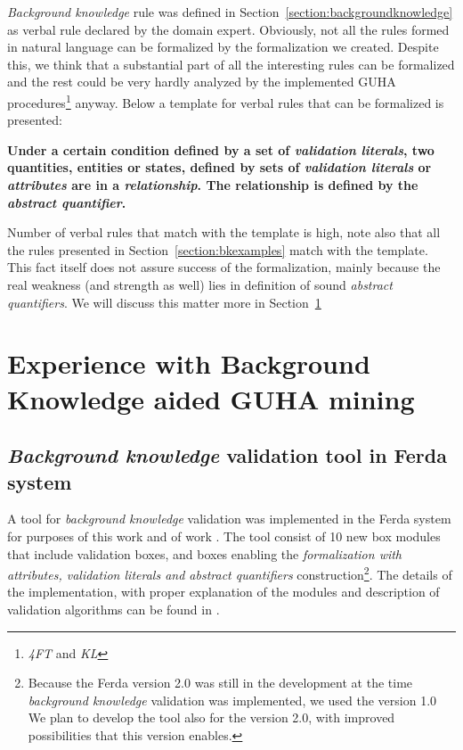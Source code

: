 \documentclass{llncs}
\begin{document}
\emph{Background knowledge} rule was defined in Section~\ref{section:backgroundknowledge}
as verbal rule declared by the domain expert. Obviously, not all the rules formed in natural
language can be formalized by the formalization we created. Despite this, we think that
a substantial part of all the interesting rules can be formalized and the rest could be
very hardly analyzed by the implemented GUHA procedures\footnote{\emph{4FT} and \emph{KL}}
anyway. Below a template for verbal rules that can be formalized is presented:

\medskip
\textbf{Under a certain condition defined by a set of \emph{validation literals},
two quantities, entities or states, defined by sets of \emph{validation literals}
or \emph{attributes} are in a \emph{relationship}. The relationship is defined by
the \emph{abstract quantifier}.}

\medskip
Number of verbal rules that match with the template is high, note also that all
the rules presented in Section~\ref{section:bkexamples} match with the template.
This fact itself does not assure success of the formalization, mainly because the
real weakness (and strength as well) lies in definition of sound \emph{abstract
quantifiers}. We will discuss this matter more in Section~\ref{section:mining}

\section{Experience with Background Knowledge aided GUHA mining}
\label{section:mining}

\subsection{\emph{Background knowledge} validation tool in Ferda system}
A tool for \emph{background knowledge} validation was implemented in the Ferda system for
purposes of this work and of work \cite{Diplomka}.
The tool consist of 10 new box modules that include validation boxes, and boxes enabling
the \emph{formalization with attributes, validation literals and abstract quantifiers}
construction\footnote{Because the Ferda version 2.0 was still in the development at
the time \emph{background knowledge} validation was implemented, we used the version 1.0 
We plan to develop the tool also for the version 2.0, with improved possibilities that
this version enables.}.
The details of the implementation, with proper explanation of the modules
and description of validation algorithms can be found in \cite{Diplomka}.
\end{document}

